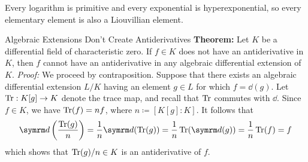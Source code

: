 Every logarithm is primitive and every exponential is hyperexponential, so every elementary element is also a Liouvillian element.

\begin{thmbox}{Algebraic Extensions Don't Create Antiderivatives}
	\textbf{Theorem:} Let $K$ be a differential field of characteristic zero. If $f \in K$ does not have an antiderivative in $K$, then $f$ cannot have an antiderivative in any algebraic differential extension of $K$.
\tcblower
	\textit{Proof:} We proceed by contraposition. Suppose that there exists an algebraic differential extension $L/K$ having an element $g \in L$ for which $f = \dd(g)$. Let $\operatorname{Tr}: K[g] \to K$ denote the trace map, and recall that $\operatorname{Tr}$ commutes with $\dd$. Since $f \in K$, we have $\operatorname{Tr}(f) = nf$, where $n \coloneq [K[g] : K]$. It follows that
	\[ \dd \left( \frac{\Tr(g)}{n} \right) = \frac{1}{n} \dd(\Tr(g)) = \frac{1}{n} \Tr(\dd(g)) = \frac{1}{n} \Tr(f) = f \]
	which shows that $\operatorname{Tr}(g)/n \in K$ is an antiderivative of $f$.
\end{thmbox}

